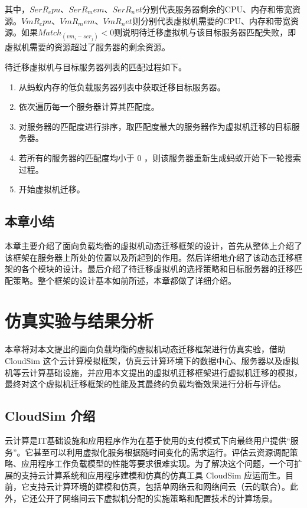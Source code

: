 其中，$SerR_cpu、SerR_mem、SerR_net $分别代表服务器剩余的CPU、内存和带宽资源。$VmR_cpu、VmR_mem、VmR_net $则分别代表虚拟机需要的CPU、内存和带宽资源。如果$ Match_(vm_i  - ser_j ) < 0 $则说明待迁移虚拟机与该目标服务器匹配失败，即虚拟机需要的资源超过了服务器的剩余资源。

待迁移虚拟机与目标服务器列表的匹配过程如下。
\begin{enumerate}
    \item 从蚂蚁内存的低负载服务器列表中获取迁移目标服务器。
    \item 依次遍历每一个服务器计算其匹配度。
    \item 对服务器的匹配度进行排序，取匹配度最大的服务器作为虚拟机迁移的目标服务器。
    \item 若所有的服务器的匹配度均小于 0 ，则该服务器重新生成蚂蚁开始下一轮搜索过程。
    \item 开始虚拟机迁移。
\end{enumerate}

\section{本章小结}
本章主要介绍了面向负载均衡的虚拟机动态迁移框架的设计，首先从整体上介绍了该框架在服务器上所处的位置以及所起到的作用。然后详细地介绍了该动态迁移框架的各个模块的设计。最后介绍了待迁移虚拟机的选择策略和目标服务器的迁移匹配策略。整个框架的设计基本如前所述，本章都做了详细介绍。

\chapter{仿真实验与结果分析}
本章将对本文提出的面向负载均衡的虚拟机动态迁移框架进行仿真实验，借助 CloudSim 这个云计算模拟框架，仿真云计算环境下的数据中心、服务器以及虚拟机等云计算基础设施，并应用本文提出的虚拟机迁移框架进行虚拟机迁移的模拟，最终对这个虚拟机迁移框架的性能及其最终的负载均衡效果进行分析与评估。

\section{CloudSim 介绍}
云计算是IT基础设施和应用程序作为在基于使用的支付模式下向最终用户提供“服务”。它甚至可以利用虚拟化服务根据随时间变化的需求运行。评估云资源调配策略、应用程序工作负载模型的性能等要求很难实现。为了解决这个问题，一个可扩展的支持云计算系统和应用程序建模和仿真的仿真工具 CloudSim 应运而生\cite{Atanasov}。目前，它支持云计算环境的建模和仿真，包括单网络云和网络间云（云的联合）。此外，它还公开了网络间云下虚拟机分配的实施策略和配置技术的计算场景。

